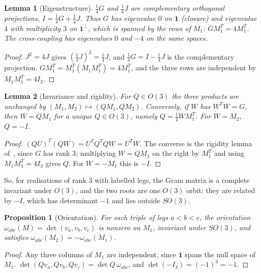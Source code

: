 \documentclass[twocolumn]{iopjournal}
\newtheorem{lemma}{Lemma}
\newtheorem{proposition}{Proposition}
\theoremstyle{definition}
\theoremstyle{remark}
\begin{document}
\begin{lemma}[Eigenstructure]
\label{lem:eigen}
$\tfrac14G$ and $\tfrac14J$ are complementary orthogonal projections,
$I = \tfrac14G + \tfrac14J$. Thus $G$ has eigenvalue $0$ on
$\mathbf{1}$ (closure) and eigenvalue $4$ with multiplicity $3$ on
$\mathbf{1}^\perp$, which is spanned by the rows of $M_1$:
$G M_1^T = 4M_1^T$. The cross-coupling has eigenvalues $0$ and $-4$
on the same spaces.
\end{lemma}

\begin{proof}
$J^2 = 4J$ gives $(\tfrac14J)^2 = \tfrac14J$, and
$\tfrac14G = I - \tfrac14J$ is the complementary projection.
$GM_1^T = M_1^T(M_1M_1^T) = 4M_1^T$, and the three rows are
independent by $M_1M_1^T = 4I_3$.
\end{proof}

\begin{lemma}[Invariance and rigidity]
\label{lem:orth}
For $Q \in O(3)$ the three products are unchanged by
$(M_1,M_2) \mapsto (QM_1, QM_2)$. Conversely, if $W$ has
$W^TW = G$, then $W = QM_1$ for a unique $Q \in O(3)$, namely
$Q = \tfrac14 WM_1^T$. For $W = M_2$, $Q = -I$.
\end{lemma}

\begin{proof}
$(QU)^T(QW) = U^TQ^TQW = U^TW$. The converse is the rigidity lemma
of~\cite{NelsonForced}, since $G$ has rank 3; multiplying
$W = QM_1$ on the right by $M_1^T$ and using $M_1M_1^T = 4I_3$ gives
$Q$. For $W = -M_1$ this is $-I$.
\end{proof}

\noindent
So, for realisations of rank 3 with labelled legs, the Gram matrix
is a complete invariant under $O(3)$, and the two roots are one
$O(3)$ orbit: they are related by
$-I$, which has determinant $-1$ and lies outside $SO(3)$.

\begin{proposition}[Orientation]
\label{prop:orient}
For each triple of legs $a<b<c$, the orientation
$\omega_{abc}(M) = \det(v_a, v_b, v_c)$ is nonzero on $M_1$,
invariant under $SO(3)$, and satisfies
$\omega_{abc}(M_2) = -\omega_{abc}(M_1)$.
\end{proposition}

\begin{proof}
Any three columns of $M_1$ are independent, since $\mathbf{1}$ spans
the null space of $M_1$. $\det(Qv_a,Qv_b,Qv_c) = \det Q\,\omega_{abc}$,
and $\det(-I_3) = (-1)^3 = -1$.
\end{proof}
\end{document}
